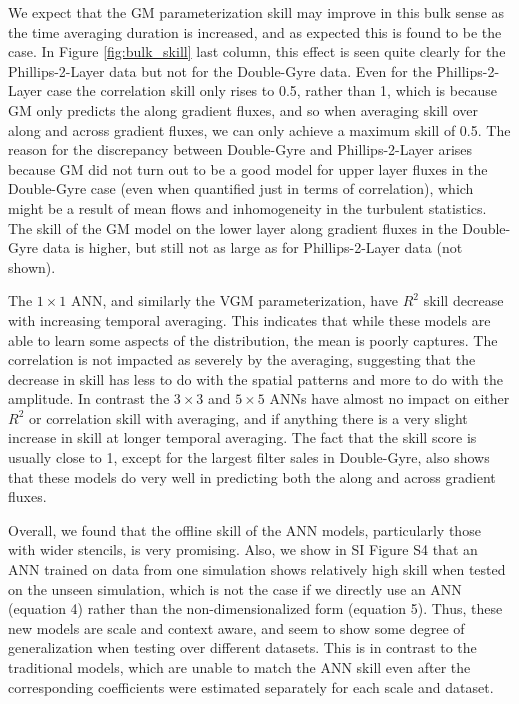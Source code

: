 \documentclass[draft]{agujournal2019}
\begin{document}
We expect that the GM parameterization skill may improve in this bulk sense as the time averaging duration is increased, and as expected this is found to be the case. In Figure \ref{fig:bulk_skill} last column, this effect is seen quite clearly for the Phillips-2-Layer data but not for the Double-Gyre data. Even for the Phillips-2-Layer case the correlation skill only rises to 0.5, rather than 1, which is because GM only predicts the along gradient fluxes, and so when averaging skill over along and across gradient fluxes, we can only achieve a maximum skill of 0.5. The reason for the discrepancy between Double-Gyre and Phillips-2-Layer arises because GM did not turn out to be a good model for upper layer fluxes in the Double-Gyre case (even when quantified just in terms of correlation), which might be a result of mean flows and inhomogeneity in the turbulent statistics. The skill of the GM model on the lower layer along gradient fluxes in the Double-Gyre data is higher, but still not as large as for Phillips-2-Layer data (not shown).

The $1\times1$ ANN, and similarly the VGM parameterization, have $R^2$ skill decrease with increasing temporal averaging. This indicates that while these models are able to learn some aspects of the distribution, the mean is poorly captures. 
The correlation is not impacted as severely by the averaging, suggesting that the decrease in skill has less to do with the spatial patterns and more to do with the amplitude.  
In contrast the $3\times3$ and $5\times5$ ANNs have almost no impact on either $R^2$ or correlation skill with averaging, and if anything there is a very slight increase in skill at longer temporal averaging. The fact that the skill score is usually close to 1, except for the largest filter sales in Double-Gyre, also shows that these models do very well in predicting both the along and across gradient fluxes. 

Overall, we found that the offline skill of the ANN models, particularly those with wider stencils, is very promising. Also, we show in SI Figure S4 that an ANN trained on data from one simulation shows relatively high skill when tested on the unseen simulation, which is not the case if we directly use an ANN (equation 4) rather than the non-dimensionalized form (equation 5). Thus, these new models are scale and context aware, and seem to show some degree of generalization when testing over different datasets. This is in contrast to the traditional models, which are unable to match the ANN skill even after the corresponding coefficients were estimated separately for each scale and dataset.  
\end{document}
